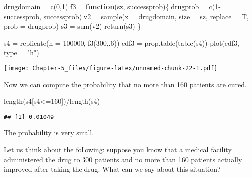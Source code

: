 \documentclass[
]{article}
\newenvironment{Shaded}{\begin{snugshade}}{\end{snugshade}}
\newcommand{\AttributeTok}[1]{\textcolor[rgb]{0.77,0.63,0.00}{#1}}
\newcommand{\ControlFlowTok}[1]{\textcolor[rgb]{0.13,0.29,0.53}{\textbf{#1}}}
\newcommand{\DecValTok}[1]{\textcolor[rgb]{0.00,0.00,0.81}{#1}}
\newcommand{\FunctionTok}[1]{\textcolor[rgb]{0.00,0.00,0.00}{#1}}
\newcommand{\NormalTok}[1]{#1}
\newcommand{\OtherTok}[1]{\textcolor[rgb]{0.56,0.35,0.01}{#1}}
\newcommand{\SpecialCharTok}[1]{\textcolor[rgb]{0.00,0.00,0.00}{#1}}
\newcommand{\StringTok}[1]{\textcolor[rgb]{0.31,0.60,0.02}{#1}}
\begin{document}
\begin{Shaded}
\begin{Highlighting}[]
\NormalTok{drugdomain }\OtherTok{=} \FunctionTok{c}\NormalTok{(}\DecValTok{0}\NormalTok{,}\DecValTok{1}\NormalTok{)}
\NormalTok{f3 }\OtherTok{=} \ControlFlowTok{function}\NormalTok{(sz, successprob)\{}
\NormalTok{  drugprob }\OtherTok{=} \FunctionTok{c}\NormalTok{(}\DecValTok{1}\SpecialCharTok{{-}}\NormalTok{successprob, successprob)}
\NormalTok{  v2 }\OtherTok{=} \FunctionTok{sample}\NormalTok{(}\AttributeTok{x =}\NormalTok{ drugdomain, }\AttributeTok{size =}\NormalTok{ sz, }\AttributeTok{replace =}\NormalTok{ T, }\AttributeTok{prob =}\NormalTok{ drugprob)}
\NormalTok{  s3 }\OtherTok{=} \FunctionTok{sum}\NormalTok{(v2)}
  \FunctionTok{return}\NormalTok{(s3)}
\NormalTok{\}}

\NormalTok{s4 }\OtherTok{=} \FunctionTok{replicate}\NormalTok{(}\AttributeTok{n =} \DecValTok{100000}\NormalTok{, }\FunctionTok{f3}\NormalTok{(}\DecValTok{300}\NormalTok{,.}\DecValTok{6}\NormalTok{))}
\NormalTok{edf3 }\OtherTok{=} \FunctionTok{prop.table}\NormalTok{(}\FunctionTok{table}\NormalTok{(s4))}
\FunctionTok{plot}\NormalTok{(edf3, }\AttributeTok{type =} \StringTok{"h"}\NormalTok{)}
\end{Highlighting}
\end{Shaded}

\texttt{[image: Chapter-5\_files/figure-latex/unnamed-chunk-22-1.pdf]}

Now we can compute the probability that no more than 160 patients are
cured.

\begin{Shaded}
\begin{Highlighting}[]
\FunctionTok{length}\NormalTok{(s4[s4}\SpecialCharTok{\textless{}=}\DecValTok{160}\NormalTok{])}\SpecialCharTok{/}\FunctionTok{length}\NormalTok{(s4)}
\end{Highlighting}
\end{Shaded}

\begin{verbatim}
## [1] 0.01049
\end{verbatim}

The probability is very small.

Let us think about the following: suppose you know that a medical
facility administered the drug to 300 patients and no more than 160
patients actually improved after taking the drug. What can we say about
this situation?
\end{document}
